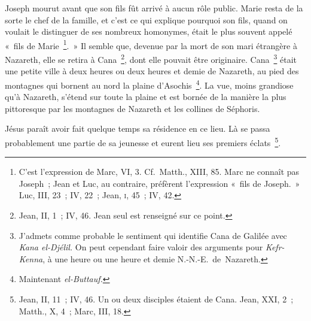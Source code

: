 \documentclass[french,twoside]{book} %
\newcommand\chaptercont{} %
\begin{document}
\chaptercont
\noindent Joseph mourut avant que son fils fût arrivé à aucun rôle public. Marie resta de la sorte le chef de la famille, et c’est ce qui explique pourquoi son fils, quand on voulait le distinguer de ses nombreux homonymes, était le plus souvent appelé « fils de Marie \footnote{ C’est l’expression de Marc, VI, 3. Cf. Matth., XIII, 85. Marc ne connaît pas Joseph ; Jean et Luc, au contraire, préfèrent l’expression « fils de Joseph. » Luc, III, 23 ; IV, 22 ; Jean, \textsc{i}, 45 ; IV, 42.}. » Il semble que, devenue par la mort de son mari étrangère à Nazareth, elle se retira à Cana \footnote{Jean, II, 1 ; IV, 46. Jean seul est renseigné sur ce point.}, dont elle pouvait être originaire. Cana \footnote{ J’admets comme probable le sentiment qui identifie Cana de Galilée avec {\itshape Kana el-Djélil.} On peut cependant faire valoir des arguments pour {\itshape Kefr-Kenna}, à une heure ou une heure et demie N.-N.-E. de Nazareth.} était une petite ville à deux heures ou deux heures et demie de Nazareth, au pied des montagnes qui bornent au nord la plaine d’Asochis \footnote{ Maintenant {\itshape el-Buttauf.}}. La vue, moins grandiose qu’à Nazareth, s’étend sur toute la plaine et est bornée de la manière la plus pittoresque par les montagnes de Nazareth et les collines de Séphoris.\par
Jésus paraît avoir fait quelque temps sa résidence en ce lieu. Là se passa probablement une partie de sa jeunesse et eurent lieu ses premiers éclats \footnote{Jean, II, 11 ; IV, 46. Un ou deux disciples étaient de Cana. Jean, XXI, 2 ; Matth., X, 4 ; Marc, III, 18.}.\par
\end{document}
